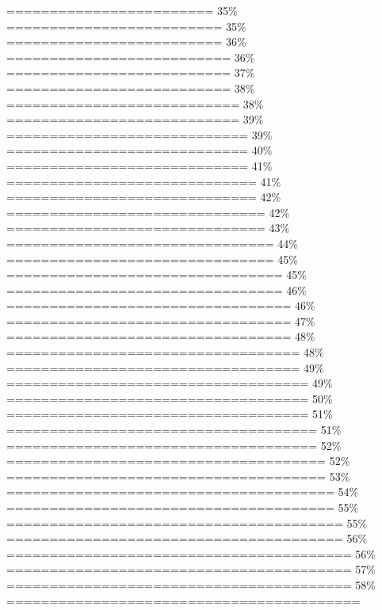 \documentclass[
]{article}
\begin{document}
\textbar======================== \textbar{} 35\% \textbar{}
\textbar========================= \textbar{} 35\% \textbar{}
\textbar========================= \textbar{} 36\% \textbar{}
\textbar========================== \textbar{} 36\% \textbar{}
\textbar========================== \textbar{} 37\% \textbar{}
\textbar========================== \textbar{} 38\% \textbar{}
\textbar=========================== \textbar{} 38\% \textbar{}
\textbar=========================== \textbar{} 39\% \textbar{}
\textbar============================ \textbar{} 39\% \textbar{}
\textbar============================ \textbar{} 40\% \textbar{}
\textbar============================ \textbar{} 41\% \textbar{}
\textbar============================= \textbar{} 41\% \textbar{}
\textbar============================= \textbar{} 42\% \textbar{}
\textbar============================== \textbar{} 42\% \textbar{}
\textbar============================== \textbar{} 43\% \textbar{}
\textbar=============================== \textbar{} 44\% \textbar{}
\textbar=============================== \textbar{} 45\% \textbar{}
\textbar================================ \textbar{} 45\% \textbar{}
\textbar================================ \textbar{} 46\% \textbar{}
\textbar================================= \textbar{} 46\% \textbar{}
\textbar================================= \textbar{} 47\% \textbar{}
\textbar================================= \textbar{} 48\% \textbar{}
\textbar================================== \textbar{} 48\% \textbar{}
\textbar================================== \textbar{} 49\% \textbar{}
\textbar=================================== \textbar{} 49\% \textbar{}
\textbar=================================== \textbar{} 50\% \textbar{}
\textbar=================================== \textbar{} 51\% \textbar{}
\textbar==================================== \textbar{} 51\% \textbar{}
\textbar==================================== \textbar{} 52\% \textbar{}
\textbar===================================== \textbar{} 52\% \textbar{}
\textbar===================================== \textbar{} 53\% \textbar{}
\textbar====================================== \textbar{} 54\%
\textbar{} \textbar====================================== \textbar{}
55\% \textbar{} \textbar=======================================
\textbar{} 55\% \textbar{}
\textbar======================================= \textbar{} 56\%
\textbar{} \textbar======================================== \textbar{}
56\% \textbar{} \textbar========================================
\textbar{} 57\% \textbar{}
\textbar======================================== \textbar{} 58\%
\textbar{} \textbar========================================= \textbar{}
\end{document}
